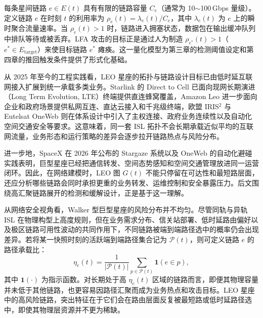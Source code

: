每条星间链路 $e \in E(t)$ 具有有限的链路容量 $C_e$（通常为 10$\sim$100\,Gbps 量级）。定义链路 $e$ 在时刻 $t$ 的利用率为 $\rho_e(t) = \lambda_e(t) / C_e$，其中 $\lambda_e(t)$ 为 $e$ 上的瞬时聚合流量速率。当 $\rho_e(t) > 1$ 时，链路进入拥塞状态，数据包在输出缓冲队列中排队等待或被丢弃。LFA 攻击的目标正是通过人为制造 $\rho_{e^*}(t) > 1$（$e^* \in E_{\text{target}}$）来使目标链路 $e^*$ 瘫痪。这一量化模型为第三章的检测阈值设定和第四章的推回触发条件提供了形式化基础。


从 2025 年至今的工程实践看，LEO 星座的拓扑与链路设计目标已由低时延互联网接入扩展到统一承载多类业务。Starlink 的 Direct to Cell 已面向现网长期演进（Long Term Evolution, LTE）终端提供直连蜂窝覆盖，Amazon Leo 进一步面向企业和政府场景提供私网互连、直达云接入和千兆级终端，欧盟 IRIS$^2$ 与 Eutelsat OneWeb 则在体系设计中引入了主权连接、政府业务连续性以及自动化空间交通安全等要求。这意味着，同一套 ISL 拓扑不会长期承载近似平均的互联网流量，业务形态和运行策略的差异会逐步拉开链路热点与风险分布。

进一步地，SpaceX 在 2026 年公布的 Stargaze 系统以及 OneWeb 的自动化避碰实践表明，巨型星座已经把通信转发、空间态势感知和空间交通管理放进同一运营闭环。因此，在网络建模时，LEO 图 $G(t)$ 不能只停留在可达性和最短路层面，还应分析哪些链路会同时承担更重的业务转发、运维控制和安全暴露压力。后文围绕高汇聚链路展开的检测和缓解设计，正是基于这一理解。


从网络安全视角看，Walker 型巨型星座的风险分布并不均匀。尽管同轨与异轨 ISL 在物理构型上高度规则，但在业务需求分布、信关站部署、低时延路由偏好以及极区链路可用性波动的共同作用下，不同链路被端到端路径选中的概率仍会出现差异。若将某一快照时刻的活跃端到端路径集合记为 $\mathcal{P}(t)$，则可定义链路 $e$ 的路径承载比：
\begin{equation}
    \eta_e(t)=\frac{1}{|\mathcal{P}(t)|}\sum_{p\in\mathcal{P}(t)} \mathbf{1}(e\in p),
\end{equation}
其中 $\mathbf{1}(\cdot)$ 为指示函数。对长期处于高 $\eta_e(t)$ 区域的链路而言，即便其物理容量并未低于其他链路，也更容易因路径汇聚而成为业务热点和攻击目标。LEO 星座中的高风险链路，突出特征在于它们会在路由层面反复被最短路或低时延路径选中，即使其物理层资源并不更为稀缺。

